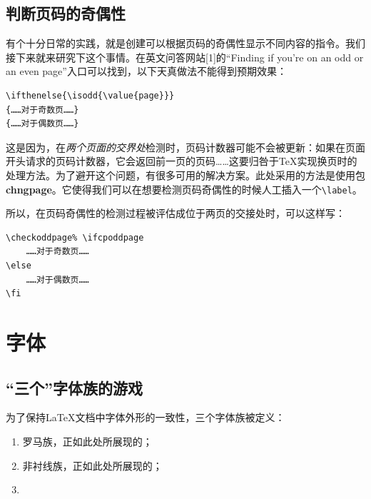 \subsection{判断页码的奇偶性}

有个十分日常的实践，就是创建可以根据页码的奇偶性显示不同内容的指令。我们接下来就来研究下这个事情。在英文问答网站[1]的“Finding if you're on an odd or an even page”入口可以找到，以下天真做法不能得到预期效果：

\begin{dmd}
\begin{verbatim}
\ifthenelse{\isodd{\value{page}}} 
{……对于奇数页……}
{……对于偶数页……}
\end{verbatim}
\end{dmd}

这是因为，在\emph{两个页面的交界处}检测时，页码计数器可能不会被更新：如果在页面开头请求的页码计数器，它会返回前一页的页码……这要归咎于\TeX 实现换页时的处理方法。为了避开这个问题，有很多可用的解决方案。此处采用的方法是使用包\textbf{chngpage}。它使得我们可以在想要检测页码奇偶性的时候人工插入一个\verb|\label|。

所以，在页码奇偶性的检测过程被评估成位于两页的交接处时，可以这样写：

\begin{dmd}
\begin{verbatim}
\checkoddpage% \ifcpoddpage
    ……对于奇数页……
\else
    ……对于偶数页……
\fi 
\end{verbatim}
\end{dmd}

\section{字体}

\subsection{“三个”字体族的游戏}

为了保持\LaTeX 文档中字体外形的一致性，三个字体族被定义：

\begin{enumerate}
    \item 罗马族，正如此处所展现的；
    \item \textsf{非衬线族，正如此处所展现的；}
    \item {}
\end{enumerate}

